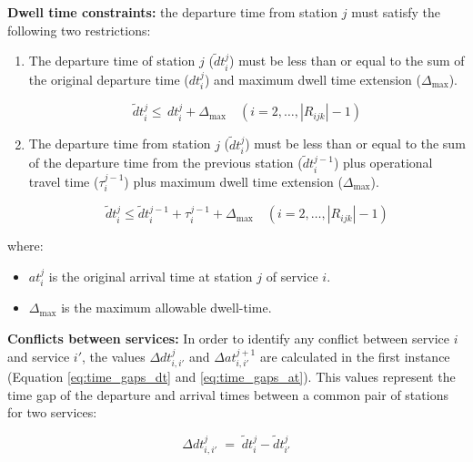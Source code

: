 \documentclass[Afour,sagev,times]{sagej}
\begin{document}
\textbf{Dwell time constraints: }the departure time from station $j$ must satisfy the following two restrictions:

\begin{enumerate}
    \item The departure time of station $ j $ ($  \tilde dt_{i}^{j} $) must be less than or equal to the sum of the original departure time ($ dt_{i}^{j} $) and maximum dwell time extension ($ \Delta_{\max} $).

    \begin{equation}
    \tilde dt_{i}^{j} \leq
    \,dt_{i}^{j} + \Delta_{\max} \quad
    (i=2,\dots,|R_{ijk}| - 1)
    \label{eq:dwell_1}
    \end{equation}

    
    \item The departure time from station $ j $ ($  \tilde dt_{i}^{j} $) must be less than or equal to the sum of the departure time from the previous station ($ \tilde dt_{i}^{j-1} $) plus operational travel time  ($ \tau_{i}^{j-1} $) plus maximum dwell time extension ($ \Delta_{\max} $).

    \begin{equation}
    \tilde dt_{i}^{j} \leq
    \tilde dt_{i}^{j-1} + \tau_{i}^{j-1} + \Delta_{\max}
    \quad
    (i=2,\dots,|R_{ijk}| - 1)
    \label{eq:dwell_2}
    \end{equation}
    
\end{enumerate}

where:
\begin{itemize}
  \item $at_{i}^{j}$ is the original arrival time at station $j$ of service $i$.
  \item $\Delta_{\max}$ is the maximum allowable dwell-time.
\end{itemize}

\textbf{Conflicts between services: } In order to identify any conflict between service $ i $ and service $ i' $, the values $ \Delta dt_{i,i'}^{j} $ and $ \Delta at_{i,i'}^{j+1} $ are calculated in the first instance (Equation \ref{eq:time_gaps_dt} and \ref{eq:time_gaps_at}). This values represent the time gap of the departure and arrival times between a common pair of stations for two services:

\begin{equation}
\Delta dt_{i,i'}^{j} \;=\; \tilde dt_{i}^{j} - \tilde dt_{i'}^{j}
\label{eq:time_gaps_dt}
\end{equation}
\end{document}
